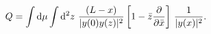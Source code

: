 \begin{equation}
Q=\int{\rm d}\mu\int {\rm d}^2z~{(L-x)\over |y(0)y(z)|^2} \left[
1-\bar z{\partial \over \partial \bar x} \right] \, {1\over
|y(x)|^2}.
\end{equation}

